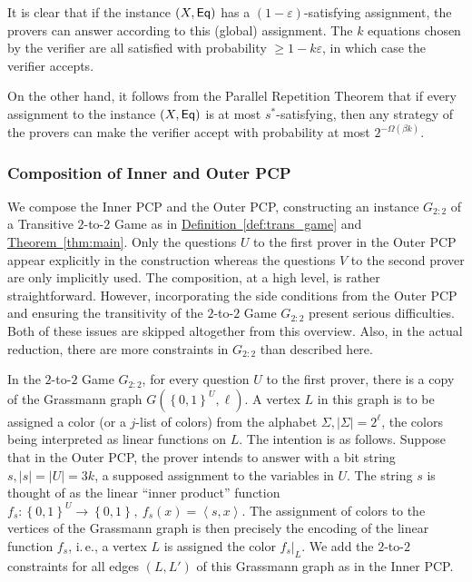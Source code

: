 \documentclass[11pt]{article}
\numberwithin{equation}{section}
\theoremstyle{definition}
\theoremstyle{plain}
\newcommand{\ie}{i.\,e.}
\newcommand{\expref}[2]{\hyperref[#2]{#1~\ref{#2}}}
\newcommand\set[1]{{\left\{ #1 \right\}}}
\newcommand\power[1]{\set{0,1}^{#1}}
\newcommand\eps{\varepsilon}
\renewcommand\geq{\geqslant}
\begin{document}
\smallskip
{} It is clear that if the instance $(X, {\sf Eq})$ has a $(1-\eps)$-satisfying assignment, the provers can answer according to this
(global) assignment. The $k$ equations chosen by the verifier are all satisfied with probability $\geq 1-k\eps$, in which case the
verifier accepts.

\smallskip
{} On the other hand, it follows from the Parallel Repetition Theorem \cite{Raz98, Holenstein, Rao, DS14} that if
every assignment to the instance $(X, {\sf Eq})$ is at most $s^*$-satisfying, then any strategy of the provers can make the verifier
accept with probability at most $2^{-\Omega(\beta k)}$.

%
\subsubsection{Composition of Inner and Outer PCP}

We compose %
the Inner PCP and the Outer PCP, constructing an instance $G_{2:2}$ of a Transitive $2$-to-$2$ Game as in \expref{Definition}{def:trans_game} and \expref{Theorem}{thm:main}.
Only the questions $U$ to the first prover in the Outer PCP appear explicitly in the construction whereas the questions $V$ to the second prover
are only implicitly used. The composition, at a high level, is rather straightforward. However, incorporating the %
%
side conditions  %
from the Outer PCP
and ensuring the transitivity %
of the $2$-to-$2$ Game $G_{2:2}$
present serious difficulties. Both of these issues are skipped altogether from this overview. Also, in the actual reduction,
there are more constraints in $G_{2:2}$ than described here.

In the $2$-to-$2$ Game $G_{2:2}$,
for every question $U$ to the first prover, there is a copy
 of the Grassmann graph $G(\power{U},\ell)$. A vertex $L$
in this graph is to be assigned a color (or a $j$-list of colors)
from the alphabet $\Sigma, |\Sigma|=2^\ell$, the colors being interpreted as linear functions on $L$. The intention is as follows. Suppose that
in the Outer PCP, the prover intends to answer with a bit string $s, |s| =|U|=3k$, a supposed assignment to the variables in $U$. The string $s$ is
thought of as the linear ``inner product'' function $f_s: \power{U} \to \power{}, ~f_s(x) = \left< s, x\right>$. The assignment of colors to the vertices of
the Grassmann graph is then precisely the encoding of the linear function $f_s$, \ie, a vertex $L$ is assigned the color ${f_s}|_L$.
We add the $2$-to-$2$ constraints for all edges $(L, L')$ of this Grassmann graph as in the Inner PCP.
\end{document}
